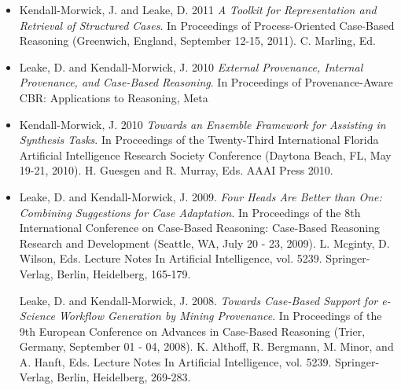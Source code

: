 \documentclass[letterpaper,11pt]{article}
\begin{document}
\begin{itemize}

\item
Kendall-Morwick, J. and Leake, D. 2011 {\it A Toolkit for Representation and Retrieval of Structured
Cases}. In Proceedings of Process-Oriented Case-Based Reasoning (Greenwich, England, September
12-15, 2011). C. Marling, Ed.

\item

Leake, D. and Kendall-Morwick, J. 2010 {\it External Provenance, Internal Provenance, and
Case-Based Reasoning}. In Proceedings of Provenance-Aware CBR: Applications to Reasoning,
Meta

\item

Kendall-Morwick, J. 2010 {\it Towards an Ensemble Framework for Assisting in Synthesis Tasks}. In
Proceedings of the Twenty-Third International Florida Artificial Intelligence Research Society
Conference (Daytona Beach, FL, May 19-21, 2010). H. Guesgen and R. Murray, Eds. AAAI Press
2010.

\item 

Leake, D. and Kendall-Morwick, J. 2009. {\it Four Heads Are Better than One: Combining Suggestions for Case Adaptation}. In Proceedings of the 8th International Conference on Case-Based Reasoning: Case-Based Reasoning Research and Development (Seattle, WA, July 20 - 23, 2009). L. Mcginty, D. Wilson, Eds. Lecture Notes In Artificial Intelligence, vol. 5239. Springer-Verlag, Berlin, Heidelberg, 165-179. 


Leake, D. and Kendall-Morwick, J. 2008. {\it Towards Case-Based Support for e-Science Workflow Generation by Mining Provenance}. In Proceedings of the 9th European Conference on Advances in Case-Based Reasoning (Trier, Germany, September 01 - 04, 2008). K. Althoff, R. Bergmann, M. Minor, and A. Hanft, Eds. Lecture Notes In Artificial Intelligence, vol. 5239. Springer-Verlag, Berlin, Heidelberg, 269-283. 


\end{itemize}
\end{document}
